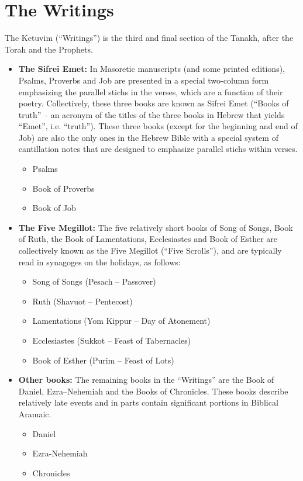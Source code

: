 \documentclass[std]{jbible}
\begin{document}
\part{The Writings}

The Ketuvim (``Writings'') is the third and final section of the Tanakh, after the Torah and the Prophets.

\begin{itemize}
  \item \textbf{The Sifrei Emet:} In Masoretic manuscripts (and some printed editions), Psalms, Proverbs and Job are presented in a special two-column form emphasizing the parallel stichs in the verses, which are a function of their poetry. Collectively, these three books are known as Sifrei Emet (``Books of truth'' -- an acronym of the titles of the three books in Hebrew that yields ``Emet'', i.e. ``truth''). These three books (except for the beginning and end of Job) are also the only ones in the Hebrew Bible with a special system of cantillation notes that are designed to emphasize parallel stichs within verses.
  \begin{itemize}
    \item Psalms
    \item Book of Proverbs
    \item Book of Job
  \end{itemize}
  
  \item \textbf{The Five Megillot:} The five relatively short books of Song of Songs, Book of Ruth, the Book of Lamentations, Ecclesiastes and Book of Esther are collectively known as the Five Megillot (``Five Scrolls''), and are typically read in synagoges on the holidays, as follows:
  \begin{itemize}
    \item Song of Songs (Pesach -- Passover)
    \item Ruth (Shavuot -- Pentecost)
    \item Lamentations (Yom Kippur -- Day of Atonement)
    \item Ecclesiastes (Sukkot -- Feast of Tabernacles)
    \item Book of Esther (Purim -- Feast of Lots)
  \end{itemize}
  
  \item \textbf{Other books:} The remaining books in the ``Writings'' are the Book of Daniel, Ezra–Nehemiah and the Books of Chronicles. These books describe relatively late events and in parts contain significant portions in Biblical Aramaic.
  \begin{itemize}
    \item Daniel
    \item Ezra-Nehemiah
    \item Chronicles
  \end{itemize}
\end{itemize}
\end{document}
